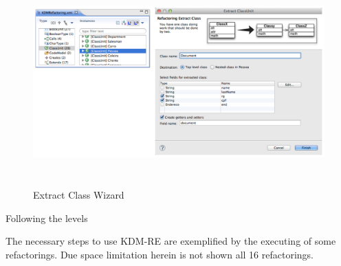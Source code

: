 \begin{figure}[!ht]
\centering
  \includegraphics[width=15cm, height=8cm]{figure/Figura_ExtractClass2}
\caption{Extract Class Wizard}
\label{fig:wizard}
\end{figure}


Following the levels 

The necessary steps to use KDM-RE are exemplified by the executing of some refactorings. Due space limitation herein is not shown all 16 refactorings. 














